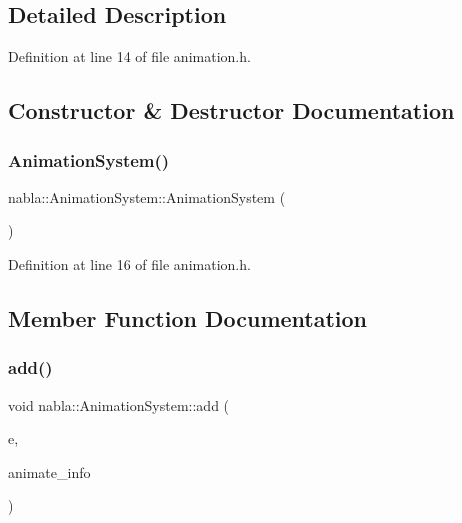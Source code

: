\subsection{Detailed Description}


Definition at line 14 of file animation.\+h.



\subsection{Constructor \& Destructor Documentation}
\mbox{\label{classnabla_1_1_animation_system_aa81c13b7ca265de5bddd85ca315d989b}} 
\subsubsection{\texorpdfstring{AnimationSystem()}{AnimationSystem()}}
{\footnotesize\ttfamily nabla\+::\+Animation\+System\+::\+Animation\+System (\begin{DoxyParamCaption}{ }\end{DoxyParamCaption})\hspace{0.3cm}{\ttfamily [inline]}}



Definition at line 16 of file animation.\+h.



\subsection{Member Function Documentation}
\mbox{\label{classnabla_1_1_animation_system_abdd187b0c5bae290de66e90b5b04ae71}} 
\subsubsection{\texorpdfstring{add()}{add()}}
{\footnotesize\ttfamily void nabla\+::\+Animation\+System\+::add (\begin{DoxyParamCaption}\item[{\mbox{\hyperlink{structnabla_1_1_entity}{Entity}}}]{e,  }\item[{\mbox{\hyperlink{structnabla_1_1_animatable_component}{Animatable\+Component}}}]{animate\+\_\+info }\end{DoxyParamCaption})\hspace{0.3cm}{\ttfamily [inline]}}



